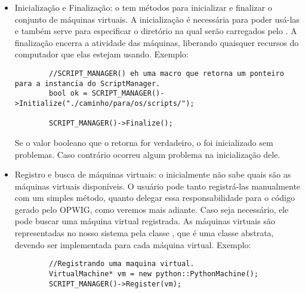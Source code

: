   
  \begin{itemize}
    \item Inicialização e Finalização: o \SMgr{} tem métodos para inicializar e finalizar o conjunto
      de máquinas virtuais. A inicialização é necessária para poder usá-las e também serve para
      especificar o diretório na qual  serão carregados pelo \SMgr{}. A finalização 
      encerra a atividade das máquinas, liberando quaisquer recursos do computador que elas
      estejam usando. Exemplo:
      \begin{lstlisting}
        //SCRIPT_MANAGER() eh uma macro que retorna um ponteiro para a instancia do ScriptManager.
        bool ok = SCRIPT_MANAGER()->Initialize("./caminho/para/os/scripts/");
        
        SCRIPT_MANAGER()->Finalize();
      \end{lstlisting}
      Se o valor booleano que o  retorna for verdadeiro, o \SMgr{} foi inicializado
      sem problemas. Caso contrário ocorreu algum problema na inicialização dele.
    \item Registro e busca de máquinas virtuais: o \SMgr{} inicialmente não sabe quais são as máquinas
      virtuais disponíveis. O usuário pode tanto registrá-las manualmente com um simples método, quanto
      delegar essa responsabilidade para o código gerado pelo OPWIG, como veremos mais adiante.
      Caso seja necessário, ele pode buscar uma máquina virtual registrada. As máquinas virtuais
      são representadas no nosso sistema pela classe \VMac{}, que é uma classe abstrata,
      devendo ser implementada para cada máquina virtual. Exemplo:
      \begin{lstlisting}
        //Registrando uma maquina virtual.
        VirtualMachine* vm = new python::PythonMachine();
        SCRIPT_MANAGER()->Register(vm);
        

\end{lstlisting}
\end{itemize}
